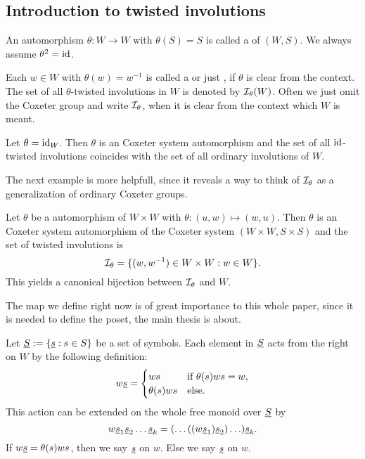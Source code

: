 \subsection{Introduction to twisted involutions}
\label{sec:twisted-involutions-introduction}

\begin{defi}
	An automorphism $\theta : W \to W$ with $\theta(S) = S$ is called a  of $(W,S)$. We always assume $\theta^2 = \operatorname{id}$.
\end{defi}

\begin{defi}
	Each $w \in W$ with $\theta(w) = w^{-1}$ is called a  or just , if $\theta$ is clear from the context. The set of all $\theta$-twisted involutions in $W$ is denoted by $\mathcal{I}_{\theta}(W)$. Often we just omit the Coxeter group and write $\mathcal{I}_{\theta}$, when it is clear from the context which $W$ is meant.
\end{defi}

\begin{exam}
	Let $\theta = \operatorname{id}_W$. Then $\theta$ is an Coxeter system automorphism and the set of all $\operatorname{id}$-twisted involutions coincides with the set of all ordinary involutions of $W$.
\end{exam}

The next example is more helpfull, since it reveals a way to think of $\mathcal{I}_{\theta}$ as a generalization of ordinary Coxeter groups.

\begin{exam}
	Let $\theta$ be a automorphism of $W \times W$ with $\theta : (u,w) \mapsto (w,u)$. Then $\theta$ is an Coxeter system automorphism of the Coxeter system $(W \times W, S \times S)$ and the set of twisted involutions is
	$$ \mathcal{I}_{\theta} = \{ (w,w^{-1}) \in W \times W : w \in W \}. $$
	This yields a canonical bijection between $\mathcal{I}_{\theta}$ and $W$.
\end{exam}

The map we define right now is of great importance to this whole paper, since it is needed to define the poset, the main thesis is about.

\begin{defi}
	Let $\underline{S} := \{ \underline{s} : s \in S \}$ be a set of symbols. Each element in $\underline{S}$ acts from the right on $W$ by the following definition:
	$$ w \underline{s} = \begin{cases}
		ws & \textrm{if } \theta(s)ws = w, \\
		\theta(s)ws & \textrm{else}. \\
	\end{cases} $$
	This action can be extended on the whole free monoid over $\underline{S}$ by
	$$ w \underline{s}_1 \underline{s}_2 \ldots \underline{s}_k = (\ldots ((w \underline{s}_1) \underline{s}_2) \ldots) \underline{s}_k. $$
	If $w \underline{s} = \theta(s)ws$, then we say $\underline{s}$  on $w$. Else we say $\underline{s}$  on $w$.
\end{defi}

